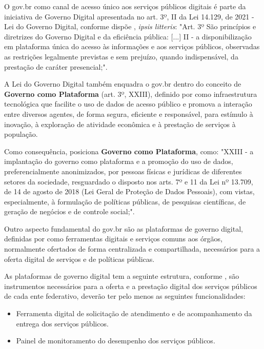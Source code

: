 O gov.br como canal de acesso único aos serviços públicos digitais é parte da iniciativa de Governo Digital apresentada no art. 3º, II da Lei 14.129, de 2021 - Lei do Governo Digital, conforme dispõe \cite{l14129}, \textit{ipsis litteris}: "Art. 3º  São princípios e diretrizes do Governo Digital e da eficiência pública: [...] II - a disponibilização em plataforma única do acesso às informações e aos serviços públicos, observadas as restrições legalmente previstas e sem prejuízo, quando indispensável, da prestação de caráter presencial;".

A Lei do Governo Digital também enquadra o gov.br dentro do conceito de \textbf{Governo como Plataforma} (art. 3º, XXIII), definido por \cite{l14129} como infraestrutura tecnológica que facilite o uso de dados de acesso público e promova a interação entre diversos agentes, de forma segura, eficiente e responsável, para estímulo à inovação, à exploração de atividade econômica e à prestação de serviços à população.

Como consequência, \cite{l14129} posiciona \textbf{Governo como Plataforma}, como: "XXIII - a implantação do governo como plataforma e a promoção do uso de dados, preferencialmente anonimizados, por pessoas físicas e jurídicas de diferentes setores da sociedade, resguardado o disposto nos arts. 7º e 11 da Lei nº 13.709, de 14 de agosto de 2018 (Lei Geral de Proteção de Dados Pessoais), com vistas, especialmente, à formulação de políticas públicas, de pesquisas científicas, de geração de negócios e de controle social;".

Outro aspecto fundamental do gov.br são as plataformas de governo digital, definidas por \cite{l14129} como ferramentas digitais e serviços comuns aos órgãos, normalmente ofertados de forma centralizada e compartilhada, necessários para a oferta digital de serviços e de políticas públicas. 

As plataformas de governo digital tem a seguinte estrutura, conforme \cite{l14129}, são instrumentos necessários para a oferta e a prestação digital dos serviços públicos de cada ente federativo, deverão ter pelo menos as seguintes funcionalidades: 

\begin{itemize}
    \item Ferramenta digital de solicitação de atendimento e de acompanhamento da entrega dos serviços públicos.
    \item Painel de monitoramento do desempenho dos serviços públicos.
\end{itemize}

